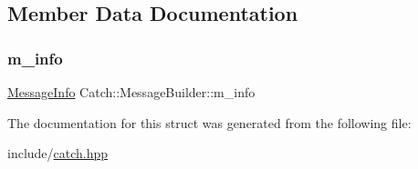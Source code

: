 \subsection{Member Data Documentation}
\mbox{\label{structCatch_1_1MessageBuilder_a979f1c2b36d78f80ee275bfa5ba0209f}} 
\subsubsection{\texorpdfstring{m\+\_\+info}{m\_info}}
{\footnotesize\ttfamily \mbox{\hyperlink{structCatch_1_1MessageInfo}{Message\+Info}} Catch\+::\+Message\+Builder\+::m\+\_\+info}



The documentation for this struct was generated from the following file\+:\begin{DoxyCompactItemize}
\item 
include/\mbox{\hyperlink{catch_8hpp}{catch.\+hpp}}\end{DoxyCompactItemize}
